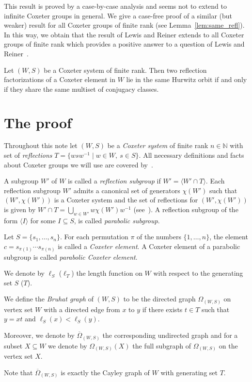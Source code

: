 This result is proved by a case-by-case analysis and seems not to extend to infinite Coxeter groups in general. We give a case-free proof of a similar (but weaker) result for all Coxeter groups of finite rank (see Lemma~\ref{lem:same_refl}). In this way, we obtain that the result of Lewis and Reiner extends to all Coxeter groups of finite rank which provides a positive answer to a question of Lewis and Reiner~\cite[Question~6.2]{LR16}.

\begin{thm} \label{thm:Main}
Let $(W,S)$ be a Coxeter system of finite rank. Then two reflection factorizations of a Coxeter element in $W$ lie in the same Hurwitz orbit if and only if they share the same multiset of conjugacy classes.
\end{thm}



\section{The proof}
Throughout this note let $(W,S)$ be a \emph{Coxeter system} of finite rank $n \in \mathbb{N}$ with set of \emph{reflections} $T=\{ wsw^{-1} \mid w \in W,~s \in S\}$. All necessary definitions and facts about Coxeter groups we will use are covered by~\cite{BDSW14, Dye90, Dye91, Hu90}.

A subgroup $W'$ of $W$ is called a \emph{reflection subgroup} if $W'= \langle W' \cap T \rangle$. Each reflection subgroup $W'$ admits a canonical set of generators $\chi(W')$ such that $(W', \chi(W'))$ is a Coxeter system and the set of reflections for $(W', \chi(W'))$ is given by $W' \cap T = \bigcup_{w \in W'} w \chi(W') w^{-1}$ (see~\cite[(3.3)~Theorem]{Dye90}). A reflection subgroup of the form $\langle I \rangle$ for some $I \subseteq S$, is called \emph{parabolic subgroup}.

Let $S =\{ s_1, \ldots , s_n \}$. For each permutation $\pi$ of the numbers $\{1, \ldots, n\}$, the element $c= s_{\pi(1)} \cdots s_{\pi(n)}$ is called a \emph{Coxeter element}. A Coxeter element of a parabolic subgroup is called \emph{parabolic Coxeter element}.

We denote by $\ell_S$ (\resp $\ell_T$) the length function on $W$ with respect to the generating set $S$ (\resp $T$).



\begin{defi} \label{def:BruhatGraph}
We define the \emph{Bruhat graph} of $(W,S)$ to be the directed graph $\Omega_{(W,S)}$ on vertex set $W$ with a directed edge from $x$ to $y$ if there exists $t \in T$ such that $y=xt$ and $\ell_S(x) < \ell_S(y)$.

Moreover, we denote by $\overline{\Omega}_{(W,S)}$ the corresponding undirected graph and for a subset $X \subseteq W$ we denote by $\Omega_{(W,S)}(X)$ the full subgraph of $\Omega_{(W,S)}$ on the vertex set $X$.

Note that $\overline{\Omega}_{(W,S)}$ is exactly the Cayley graph of $W$ with generating set $T$. 
\end{defi}

